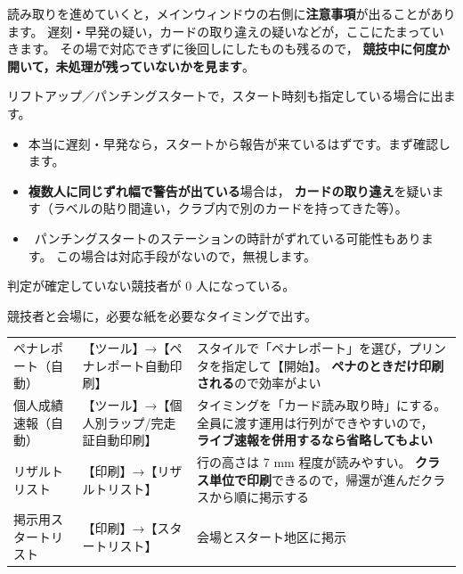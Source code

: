 \begin{Note}[注意事項リスト]
読み取りを進めていくと，メインウィンドウの右側に\textbf{注意事項}が出ることがあります。
遅刻・早発の疑い，カードの取り違えの疑いなどが，ここにたまっていきます。
その場で対応できずに後回しにしたものも残るので，
\textbf{競技中に何度か開いて，未処理が残っていないかを見ます}。
\end{Note}

\begin{Note}[遅刻・早発の警告が出たとき]
リフトアップ／パンチングスタートで，スタート時刻も指定している場合に出ます。
\begin{itemize}
\item 本当に遅刻・早発なら，スタートから報告が来ているはずです。まず確認します。
\item \textbf{複数人に同じずれ幅で警告が出ている}場合は，
      \textbf{カードの取り違え}を疑います（ラベルの貼り間違い，クラブ内で別のカードを持ってきた等）。
\item \tSI\ パンチングスタートのステーションの時計がずれている可能性もあります。
      この場合は対応手段がないので，無視します。
\end{itemize}
\end{Note}

\begin{Done}
判定が確定していない競技者が 0 人になっている。
\end{Done}


\begin{Goal}
競技者と会場に，必要な紙を必要なタイミングで出す。
\end{Goal}

\begin{center}
\small
\begin{tabular}{@{}P{32mm}P{48mm}P{62mm}@{}}
\toprule
{} &  &  \\
\midrule
ペナレポート（自動） & 【ツール】→【ペナレポート自動印刷】
  & スタイルで「ペナレポート」を選び，プリンタを指定して【開始】。
    \textbf{ペナのときだけ印刷される}ので効率がよい \\
個人成績速報（自動） & 【ツール】→【個人別ラップ/完走証自動印刷】
  & タイミングを「カード読み取り時」にする。
    全員に渡す運用は行列ができやすいので，
    \textbf{ライブ速報を併用するなら省略してもよい} \\
リザルトリスト & 【印刷】→【リザルトリスト】
  & 行の高さは 7 mm 程度が読みやすい。
    \textbf{クラス単位で印刷}できるので，帰還が進んだクラスから順に掲示する \\
掲示用スタートリスト & 【印刷】→【スタートリスト】 & 会場とスタート地区に掲示 \\
\bottomrule
\end{tabular}
\end{center}


